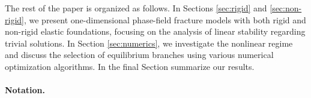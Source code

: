 The rest of the paper is organized as follows. In Sections \ref{sec:rigid} and \ref{sec:non-rigid}, we present one-dimensional phase-field fracture models with both rigid and non-rigid elastic foundations, focusing on the analysis  of linear stability regarding trivial solutions. In Section \ref{sec:numerics}, we investigate the nonlinear regime and discuss the selection of equilibrium branches using various numerical optimization algorithms. In the final Section  summarize our results.

\paragraph{Notation.} 